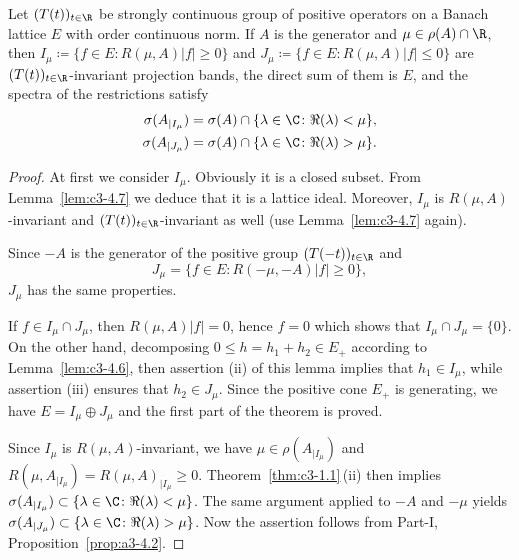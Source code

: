\begin{theorem} \label{thm:c3-4.8}
Let $(T(t))_{t \in \R }$ be strongly continuous group of positive
operators on a Banach lattice $E$ with order continuous norm.
If\/ $A$ is the generator and $\mu \in \rho(A) \cap \R $, then
$I_{\mu} \coloneqq  \{f \in E \colon R(\mu,A)|f| \geq 0\}$ and $J_{\mu} \coloneqq  \{f \in E \colon R(\mu,A)|f| \leq 0\}$
are $(T(t))_{t \in \R }$-invariant projection bands, 
the direct sum of them is $E$, and the spectra of the restrictions satisfy
\begin{align*}
	\sigma(A_{|I_{\mu}}) &= \sigma(A) \cap \{\lambda \in \C  \colon \Re(\lambda) < \mu\} ,\\
	\sigma(A_{|J_{\mu}}) &= \sigma(A) \cap \{\lambda \in \C  \colon \Re(\lambda) > \mu\} .
\end{align*}
\end{theorem}
\begin{proof}
At first we consider $I_{\mu}$. Obviously it is a closed subset.
From Lemma~\ref{lem:c3-4.7} we deduce that it is a lattice ideal. Moreover, $I_{\mu}$
is $R(\mu,A)$-invariant and $(T(t))_{t \in \R }$-invariant as well (use Lemma~\ref{lem:c3-4.7} again).

Since $-A$ is the generator of the positive group $(T(-t))_{t \in \R }$ and
%
\[
	 J_{\mu} = \{f \in E \colon R(-\mu,-A)|f| \geq 0\} ,
\]
%
$J_{\mu}$ has the same properties.

If\/ $f \in I_{\mu} \cap J_{\mu}$, then $R(\mu,A)|f| = 0$, hence $f = 0$ which shows that
$I_{\mu} \cap J_{\mu} = \{0\}$. On the other hand, decomposing $0 \leq h = h_1 + h_2 \in E_+$
according to Lemma~\ref{lem:c3-4.6}, then assertion (ii) of this lemma implies
that $h_1 \in I_{\mu}$, while assertion (iii) ensures that $h_2 \in J_{\mu}$. Since the
positive cone $E_+$ is generating, we have $E = I_{\mu} \oplus J_{\mu}$ and the first part
of the theorem is proved.

Since $I_{\mu}$ is $R(\mu,A)$-invariant, we have $\mu \in \rho(A_{|I_{\mu}})$ and
$R(\mu,A_{|I_{\mu}}) = R(\mu,A)_{|I_{\mu}} \geq 0$. Theorem~\ref{thm:c3-1.1}\,(ii) then implies
$\sigma(A_{\vert I_{\mu}}) \subset \{\lambda \in \C  \colon \Re(\lambda) < \mu\}$. The same argument applied to $-A$ and
$-\mu$ yields $\sigma(A_{|J_{\mu}}) \subset \{\lambda \in \C  \colon \Re(\lambda) > \mu\}$. Now the assertion follows
from Part-I, Proposition~\ref{prop:a3-4.2}.
\end{proof}

